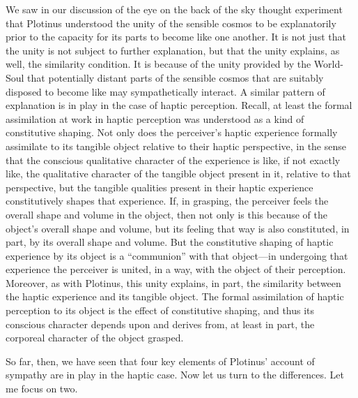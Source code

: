 We saw in our discussion of the eye on the back of the sky thought experiment that Plotinus understood the unity of the sensible cosmos to be explanatorily prior to the capacity for its parts to become like one another. It is not just that the unity is not subject to further explanation, but that the unity explains, as well, the similarity condition. It is because of the unity provided by the World-Soul that potentially distant parts of the sensible cosmos that are suitably disposed to become like may sympathetically interact. A similar pattern of explanation is in play in the case of haptic perception. Recall, at least the formal assimilation at work in haptic perception was understood as a kind of constitutive shaping. Not only does the perceiver's haptic experience formally assimilate to its tangible object relative to their haptic perspective, in the sense that the conscious qualitative character of the experience is like, if not exactly like, the qualitative character of the tangible object present in it, relative to that perspective, but the tangible qualities present in their haptic experience constitutively shapes that experience. If, in grasping, the perceiver feels the overall shape and volume in the object, then not only is this because of the object's overall shape and volume, but its feeling that way is also constituted, in part, by its overall shape and volume. But the constitutive shaping of haptic experience by its object is a ``communion'' with that object---in undergoing that experience the perceiver is united, in a way, with the object of their perception. Moreover, as with Plotinus, this unity explains, in part, the similarity between the haptic experience and its tangible object. The formal assimilation of haptic perception to its object is the effect of constitutive shaping, and thus its conscious character depends upon and derives from, at least in part, the corporeal character of the object grasped.

So far, then, we have seen that four key elements of Plotinus' account of sympathy are in play in the haptic case. Now let us turn to the differences. Let me focus on two. 

